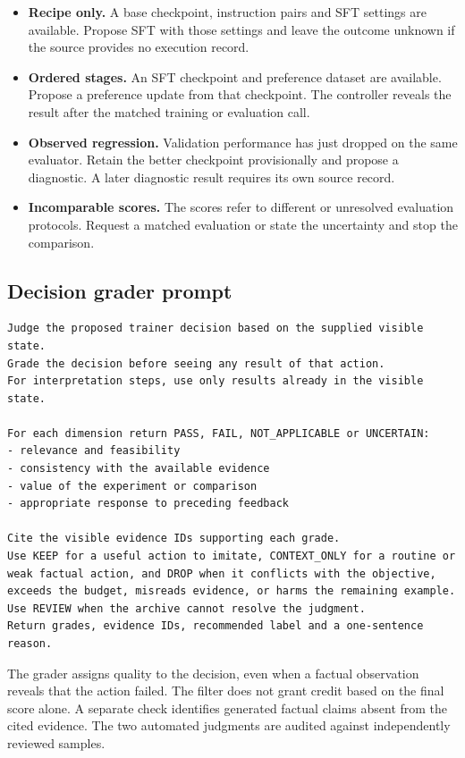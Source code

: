 \begin{itemize}
  \item \textbf{Recipe only.} A base checkpoint, instruction pairs and SFT settings are available. Propose SFT with those settings and leave the outcome unknown if the source provides no execution record.
  \item \textbf{Ordered stages.} An SFT checkpoint and preference dataset are available. Propose a preference update from that checkpoint. The controller reveals the result after the matched training or evaluation call.
  \item \textbf{Observed regression.} Validation performance has just dropped on the same evaluator. Retain the better checkpoint provisionally and propose a diagnostic. A later diagnostic result requires its own source record.
  \item \textbf{Incomparable scores.} The scores refer to different or unresolved evaluation protocols. Request a matched evaluation or state the uncertainty and stop the comparison.
\end{itemize}

\subsection{Decision grader prompt}

\begin{verbatim}
Judge the proposed trainer decision based on the supplied visible state.
Grade the decision before seeing any result of that action.
For interpretation steps, use only results already in the visible state.

For each dimension return PASS, FAIL, NOT_APPLICABLE or UNCERTAIN:
- relevance and feasibility
- consistency with the available evidence
- value of the experiment or comparison
- appropriate response to preceding feedback

Cite the visible evidence IDs supporting each grade.
Use KEEP for a useful action to imitate, CONTEXT_ONLY for a routine or
weak factual action, and DROP when it conflicts with the objective,
exceeds the budget, misreads evidence, or harms the remaining example.
Use REVIEW when the archive cannot resolve the judgment.
Return grades, evidence IDs, recommended label and a one-sentence reason.
\end{verbatim}

The grader assigns quality to the decision, even when a factual observation reveals that the action failed. The filter does not grant credit based on the final score alone. A separate check identifies generated factual claims absent from the cited evidence. The two automated judgments are audited against independently reviewed samples.

